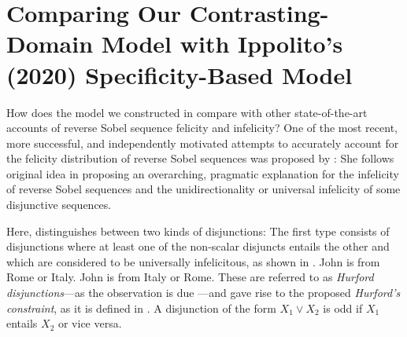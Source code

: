 \chapter{Comparing Our Contrasting-Domain Model with Ippolito's (2020) Specificity-Based Model}
How does the model we constructed in  compare with other state-of-the-art accounts of reverse Sobel sequence felicity and infelicity? One of the most recent, more successful, and independently motivated attempts to accurately account for the felicity distribution of reverse Sobel sequences was proposed by \textcite{Ippolito2020}: She follows  original idea in proposing an overarching, pragmatic explanation for the infelicity of reverse Sobel sequences and the unidirectionality or universal infelicity of some disjunctive sequences.

Here, \textcite{Ippolito2020} distinguishes between two kinds of disjunctions: The first type consists of disjunctions where at least one of the non-scalar disjuncts entails the other and which are considered to be universally infelicitous, as shown in .
\pex\label{ex:hurford}
\a\ljudge{\#}John is from Rome or Italy.
\a\ljudge{\#}John is from Italy or Rome.
\xe
These are referred to as \textit{Hurford disjunctions}---as the observation is due \textcite{Hurford1974}---and gave rise to the proposed \textit{Hurford's constraint}, as it is defined in .
\ex
{}
A disjunction of the form $X_1\lor X_2$ is odd if $X_1$ entails $X_2$ or vice versa.\\\emptyfill\parencite[p. 202]{Katzir2014}
\xe

